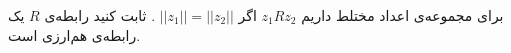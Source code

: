 \EXERCISE
برای مجموعه‌ی اعداد مختلط داریم
$z_1Rz_2$
اگر
$||z_1|| = ||z_2||$
. ثابت کنید رابطه‌ی
$R$
یک رابطه‌ی هم‌ارزی است.